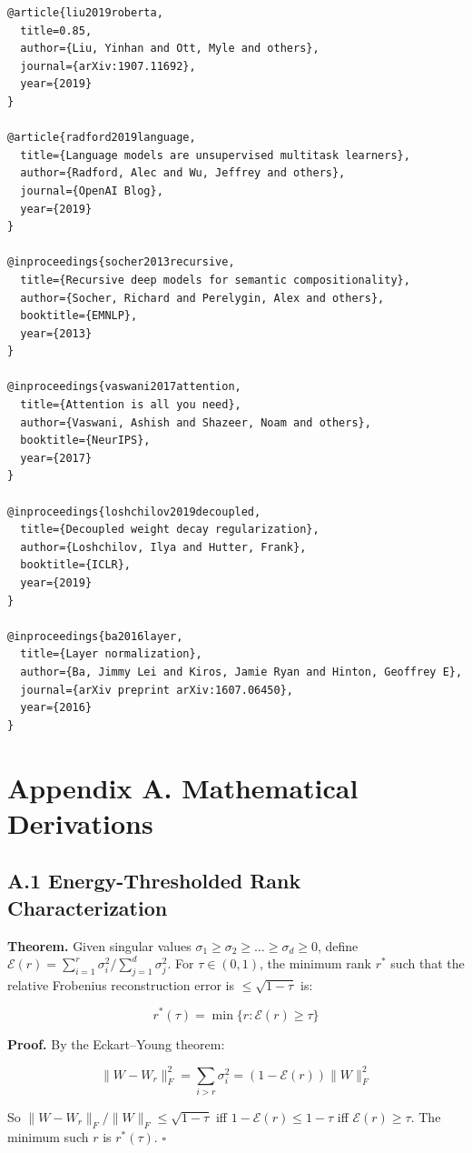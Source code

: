 \begin{lstlisting}
@article{liu2019roberta,
  title=0.85,
  author={Liu, Yinhan and Ott, Myle and others},
  journal={arXiv:1907.11692},
  year={2019}
}

@article{radford2019language,
  title={Language models are unsupervised multitask learners},
  author={Radford, Alec and Wu, Jeffrey and others},
  journal={OpenAI Blog},
  year={2019}
}

@inproceedings{socher2013recursive,
  title={Recursive deep models for semantic compositionality},
  author={Socher, Richard and Perelygin, Alex and others},
  booktitle={EMNLP},
  year={2013}
}

@inproceedings{vaswani2017attention,
  title={Attention is all you need},
  author={Vaswani, Ashish and Shazeer, Noam and others},
  booktitle={NeurIPS},
  year={2017}
}

@inproceedings{loshchilov2019decoupled,
  title={Decoupled weight decay regularization},
  author={Loshchilov, Ilya and Hutter, Frank},
  booktitle={ICLR},
  year={2019}
}

@inproceedings{ba2016layer,
  title={Layer normalization},
  author={Ba, Jimmy Lei and Kiros, Jamie Ryan and Hinton, Geoffrey E},
  journal={arXiv preprint arXiv:1607.06450},
  year={2016}
}
\end{lstlisting}


\section{Appendix A. Mathematical Derivations}

\subsection{A.1 Energy-Thresholded Rank Characterization}

\textbf{Theorem.} Given singular values $\sigma_1 \geq \sigma_2 \geq \dots \geq \sigma_d \geq 0$, 
define $\mathcal{E}(r) = \sum_{i=1}^r \sigma_i^2 / \sum_{j=1}^d \sigma_j^2$. For 
$\tau \in (0, 1)$, the minimum rank $r^*$ such that the relative Frobenius 
reconstruction error is $\leq \sqrt{1 - \tau}$ is:

\[
r^*(\tau) = \min\{r : \mathcal{E}(r) \geq \tau\}
\tag{A.1}
\]

\textbf{Proof.} By the Eckart--Young theorem:

\[
\|W - W_r\|_F^2 = \sum_{i > r} \sigma_i^2 = (1 - \mathcal{E}(r)) \|W\|_F^2
\tag{A.2}
\]

So $\|W - W_r\|_F / \|W\|_F \leq \sqrt{1 - \tau}$ iff $1 - \mathcal{E}(r) \leq 1 - \tau$ 
iff $\mathcal{E}(r) \geq \tau$. The minimum such $r$ is $r^*(\tau)$. $\square$

